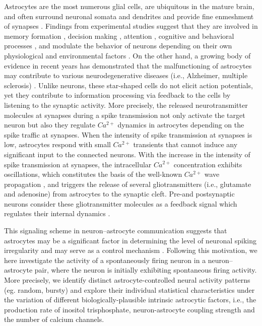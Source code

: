 \documentclass[%
 aip,
 amsmath,amssymb,
 reprint,%
]{revtex4-1}
\begin{document}
	Astrocytes are the most numerous glial cells, are ubiquitous in the mature brain, and often surround neuronal somata and dendrites and provide fine enmeshment of synapses \cite{Sofroniew2010, Chung2015}. Findings from experimental studies suggest that they are involved in memory formation \cite{Zorec2015}, decision making \cite {Wang2017}, attention \cite{Guimaraes2018}, cognitive \cite{Brockett2018} and behavioral processes \cite{Hwang2021}, and modulate the behavior of neurons depending on their own physiological and environmental factors \cite{Halassa2010}. On the other hand, a growing body of evidence in recent years has demonstrated that the malfunctioning of astrocytes may contribute to various neurodegenerative diseases (i.e., Alzheimer, multiple sclerosis) \cite{Preman2021}. Unlike neurons, these star-shaped cells do not elicit action potentials, yet they contribute to information processing via feedback to the cells by listening to the synaptic activity. More precisely, the released neurotransmitter molecules at synapses during a spike transmission not only activate the target neuron but also they regulate $Ca^{2+}$ dynamics in astrocytes depending on the spike traffic at synapses. When the intensity of spike transmission at synapses is low, astrocytes respond with small $Ca^{2+}$ transients that cannot induce any significant input to the connected neurons. With the increase in the intensity of spike transmission at synapses, the intracellular $Ca^{2+}$ concentration exhibits oscillations, which constitutes the basis of the well-known $Ca^{2+}$ wave propagation \cite{Bazargani2016}, and triggers the release of several gliotransmitters (i.e., glutamate and adenosine) from astrocytes to the synaptic cleft. Pre-and postsynaptic neurons consider these gliotransmitter molecules as a feedback signal which regulates their internal dynamics \cite{ DePitta2009, yilmaz2019, calim2021}. 
	
	This signaling scheme in neuron–astrocyte communication suggests that astrocytes may be a significant factor in determining the level of neuronal spiking irregularity and may serve as a control mechanism \cite{Fellin2004, Wade2011}. Following this motivation, we here investigate the activity of a spontaneously firing neuron in a neuron–astrocyte pair, where the neuron is initially exhibiting spontaneous firing activity. More precisely, we identify distinct astrocyte-controlled neural activity patterns (eg. random, bursty) and explore their individual statistical characteristics under the variation of different biologically-plausible intrinsic astrocytic factors, i.e., the production rate of inositol trisphosphate, neuron-astrocyte coupling strength and the number of calcium channels.
	
\end{document}
